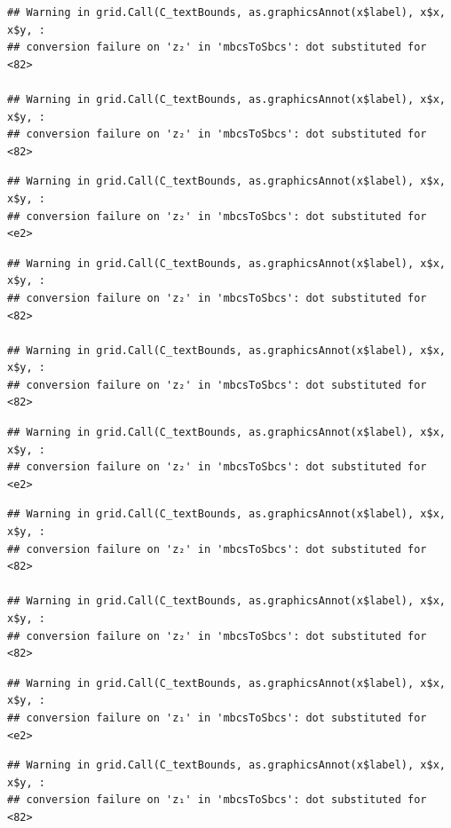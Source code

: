 \documentclass[]{article}
\begin{document}
\begin{verbatim}
## Warning in grid.Call(C_textBounds, as.graphicsAnnot(x$label), x$x, x$y, :
## conversion failure on 'z₂' in 'mbcsToSbcs': dot substituted for <82>

## Warning in grid.Call(C_textBounds, as.graphicsAnnot(x$label), x$x, x$y, :
## conversion failure on 'z₂' in 'mbcsToSbcs': dot substituted for <82>
\end{verbatim}

\begin{verbatim}
## Warning in grid.Call(C_textBounds, as.graphicsAnnot(x$label), x$x, x$y, :
## conversion failure on 'z₂' in 'mbcsToSbcs': dot substituted for <e2>
\end{verbatim}

\begin{verbatim}
## Warning in grid.Call(C_textBounds, as.graphicsAnnot(x$label), x$x, x$y, :
## conversion failure on 'z₂' in 'mbcsToSbcs': dot substituted for <82>

## Warning in grid.Call(C_textBounds, as.graphicsAnnot(x$label), x$x, x$y, :
## conversion failure on 'z₂' in 'mbcsToSbcs': dot substituted for <82>
\end{verbatim}

\begin{verbatim}
## Warning in grid.Call(C_textBounds, as.graphicsAnnot(x$label), x$x, x$y, :
## conversion failure on 'z₂' in 'mbcsToSbcs': dot substituted for <e2>
\end{verbatim}

\begin{verbatim}
## Warning in grid.Call(C_textBounds, as.graphicsAnnot(x$label), x$x, x$y, :
## conversion failure on 'z₂' in 'mbcsToSbcs': dot substituted for <82>

## Warning in grid.Call(C_textBounds, as.graphicsAnnot(x$label), x$x, x$y, :
## conversion failure on 'z₂' in 'mbcsToSbcs': dot substituted for <82>
\end{verbatim}

\begin{verbatim}
## Warning in grid.Call(C_textBounds, as.graphicsAnnot(x$label), x$x, x$y, :
## conversion failure on 'z₁' in 'mbcsToSbcs': dot substituted for <e2>
\end{verbatim}

\begin{verbatim}
## Warning in grid.Call(C_textBounds, as.graphicsAnnot(x$label), x$x, x$y, :
## conversion failure on 'z₁' in 'mbcsToSbcs': dot substituted for <82>
\end{verbatim}
\end{document}
